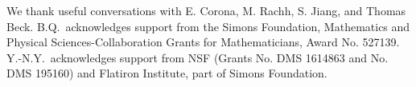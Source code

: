 \documentclass[prb,preprint,showpacs,preprintnumbers,amsmath,amssymb,longbibliography]{revtex4-1}
\begin{document}
\begin{acknowledgments}
We thank useful conversations with E. Corona, M. Rachh, S. Jiang, and Thomas Beck.
B.Q.~acknowledges support from the Simons Foundation, Mathematics and Physical Sciences-Collaboration Grants for Mathematicians, Award No. 527139.
Y.-N.Y.~acknowledges support from NSF (Grants No. DMS 1614863 and No. DMS 195160) and Flatiron Institute, part of Simons Foundation.

\end{acknowledgments}




\end{document}
